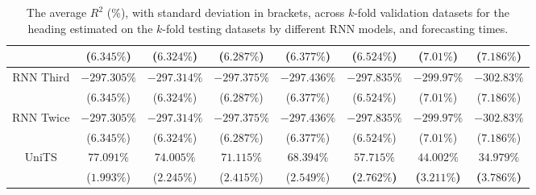 \begin{table}[!ht]
{\begin{tabular}{|c|c|c|c|c|c|c|c|}
			 & ($6.345\%$) & ($6.324\%$) & ($6.287\%$) & ($6.377\%$) & ($6.524\%$) & ($7.01\%$) & ($7.186\%$) \\ \hline
			\multirow{2}{*}{RNN Third} & $-297.305\%$ & $-297.314\%$ & $-297.375\%$ & $-297.436\%$ & $-297.835\%$ & $-299.97\%$ & $-302.83\%$ \\
			 & ($6.345\%$) & ($6.324\%$) & ($6.287\%$) & ($6.377\%$) & ($6.524\%$) & ($7.01\%$) & ($7.186\%$) \\ \hline
			\multirow{2}{*}{RNN Twice} & $-297.305\%$ & $-297.314\%$ & $-297.375\%$ & $-297.436\%$ & $-297.835\%$ & $-299.97\%$ & $-302.83\%$ \\
			 & ($6.345\%$) & ($6.324\%$) & ($6.287\%$) & ($6.377\%$) & ($6.524\%$) & ($7.01\%$) & ($7.186\%$) \\ \hline
			\multirow{2}{*}{UniTS} & $77.091\%$ & $74.005\%$ & $71.115\%$ & $68.394\%$ & $\mathbf{57.715\%}$ & $\mathbf{44.002\%}$ & $\mathbf{34.979\%}$ \\
			 & ($1.993\%$) & ($2.245\%$) & ($2.415\%$) & ($2.549\%$) & \textbf{(}$\mathbf{2.762\%}$\textbf{)} & \textbf{(}$\mathbf{3.211\%}$\textbf{)} & \textbf{(}$\mathbf{3.786\%}$\textbf{)} \\ \hline
		\end{tabular}
	}
	\caption{The average $R^{2}$ (\%), with standard deviation in brackets, across $k$-fold validation datasets for the heading estimated on the $k$-fold testing datasets by different RNN models, and forecasting times.}
	\label{tab:all_direction_R2}
\end{table}

